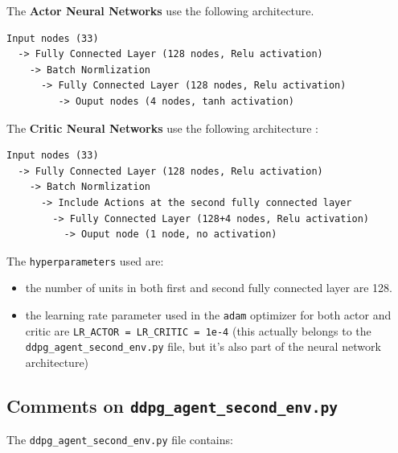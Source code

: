 \documentclass[
]{article}
\providecommand{\tightlist}{%
  \setlength{\itemsep}{0pt}\setlength{\parskip}{0pt}}
\begin{document}
The \textbf{Actor Neural Networks} use the following architecture.

\begin{verbatim}
Input nodes (33) 
  -> Fully Connected Layer (128 nodes, Relu activation) 
    -> Batch Normlization
      -> Fully Connected Layer (128 nodes, Relu activation) 
         -> Ouput nodes (4 nodes, tanh activation)
\end{verbatim}

The \textbf{Critic Neural Networks} use the following architecture :

\begin{verbatim}
Input nodes (33) 
  -> Fully Connected Layer (128 nodes, Relu activation) 
    -> Batch Normlization
      -> Include Actions at the second fully connected layer
        -> Fully Connected Layer (128+4 nodes, Relu activation) 
          -> Ouput node (1 node, no activation)
\end{verbatim}

The \texttt{hyperparameters} used are:

\begin{itemize}
\tightlist
\item
  the number of units in both first and second fully connected layer are
  128.
\item
  the learning rate parameter used in the \texttt{adam} optimizer for
  both actor and critic are \texttt{LR\_ACTOR\ =\ LR\_CRITIC\ =\ 1e-4}
  (this actually belongs to the \texttt{ddpg\_agent\_second\_env.py}
  file, but it's also part of the neural network architecture)
\end{itemize}

\hypertarget{comments-on-ddpg_agent_second_env.py}{%
\subsection{\texorpdfstring{Comments on
\texttt{ddpg\_agent\_second\_env.py}}{Comments on ddpg\_agent\_second\_env.py}}\label{comments-on-ddpg_agent_second_env.py}}

The \texttt{ddpg\_agent\_second\_env.py} file contains:
\end{document}
